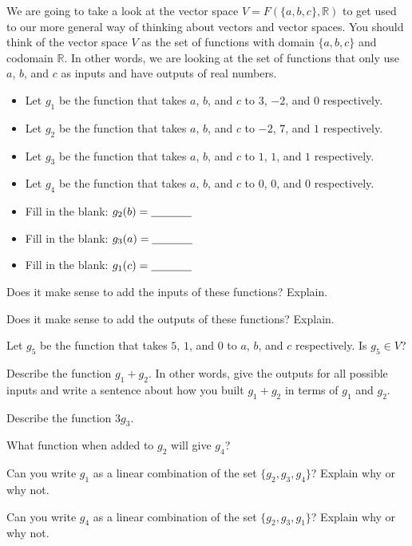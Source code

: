 \bq We are going to take a look at the vector space \break $V=F(\{a,b,c\},\mathbb{R})$ to get used to our more general way of thinking about vectors and vector spaces. You should think of the vector space $V$ as the set of functions with domain $\{a,b,c\}$ and codomain $\mathbb{R}$. In other words, we are looking at the set of functions that only use $a$, $b$, and $c$ as inputs and have outputs of real numbers.
\begin{itemize}
\item Let $g_1$ be the function that takes $a$, $b$, and $c$ to $3$, $-2$, and $0$ respectively.
\item Let $g_2$ be the function that takes $a$, $b$, and $c$ to $-2$, $7$, and $1$ respectively.
\item Let $g_3$ be the function that takes $a$, $b$, and $c$ to $1$, $1$, and $1$ respectively.
\item Let $g_4$ be the function that takes $a$, $b$, and $c$ to $0$, $0$, and $0$ respectively.
\item Fill in the blank: $g_2(b) = \underline{\hspace{.5in}}$
\item Fill in the blank: $g_3(a) = \underline{\hspace{.5in}}$
\item Fill in the blank: $g_1(c) = \underline{\hspace{.5in}}$
\end{itemize}
\be
\item Does it make sense to add the inputs of these functions? Explain.
\item Does it make sense to add the outputs of these functions? Explain.
\item Let $g_5$ be the function that takes $5$, $1$, and $0$ to $a$, $b$, and $c$ respectively. Is $g_5 \in V$?
\item Describe the function $g_1 +g_2$. In other words, give the outputs for all possible inputs and write a sentence about how you built $g_1+g_2$ in terms of $g_1$ and $g_2$.
\item Describe the function $3 g_3$.
\item What function when added to $g_2$ will give $g_4$?
\item Can you write $g_1$ as a linear combination of the set $\{ g_2 , g_3 , g_4\}$? Explain why or why not.
\item Can you write $g_4$ as a linear combination of the set $\{ g_2 , g_3 , g_1\}$? Explain why or why not.
\ee
\eq

